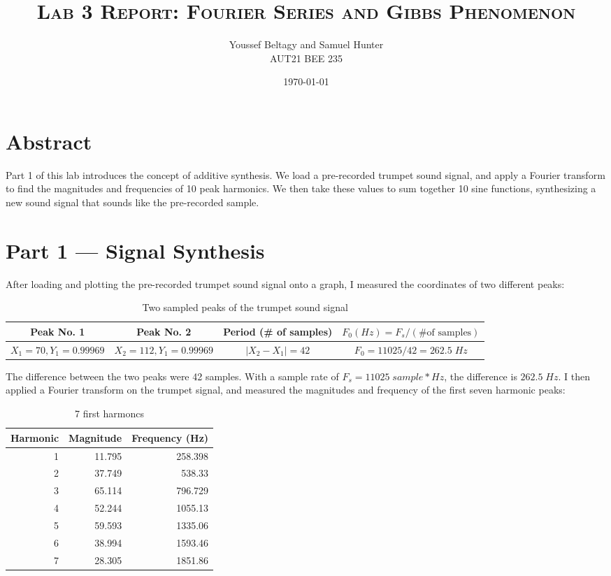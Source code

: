 \documentclass[11pt]{article}
\title{
    \textsc{Lab 3 Report: Fourier Series and Gibbs Phenomenon}
}
\author{
    \Large{Youssef Beltagy and Samuel Hunter} \\
    \large \textsc{AUT21 BEE 235}
}
\date{\today}
\begin{document}
\maketitle %
\pagebreak


\section{Abstract}

Part 1 of this lab introduces the concept of additive synthesis.
We load a pre-recorded trumpet sound signal, and apply a Fourier transform to find the magnitudes and frequencies of 10 peak harmonics.
We then take these values to sum together 10 sine functions, synthesizing a new sound signal that sounds like the pre-recorded sample.

\section{Part 1 --- Signal Synthesis}

After loading and plotting the pre-recorded trumpet sound signal onto a graph, I measured the coordinates of two different peaks:

\begin{table}[H]
	\centering
	\begin{tabular}{cccc}\toprule
		Peak No. 1 & Peak No. 2 & Period (\# of samples) & $F_0 (Hz) = F_s / (\textrm{\# of samples})$ \\\midrule

		$X_1 = 70, Y_1 = 0.99969$ &
		$X_2 = 112, Y_1 = 0.99969$ &
		$|X_2-X_1| = 42$ &
		$F_0 = 11025 / 42 = 262.5\;Hz$ \\\bottomrule
	\end{tabular}
	\caption{\label{tab:two-peaks}Two sampled peaks of the trumpet sound signal}
\end{table}

The difference between the two peaks were 42 samples.
With a sample rate of $F_s = 11025\;sample*Hz$, the difference is $262.5\;Hz$.
I then applied a Fourier transform on the trumpet signal, and measured the magnitudes and frequency of the first seven harmonic peaks:

\begin{table}[H]
	\centering
	\begin{tabular}{rrr}\toprule
		Harmonic & Magnitude & Frequency (Hz) \\\midrule

		1 & 11.795 & 258.398 \\
		2 & 37.749 & 538.33  \\
		3 & 65.114 & 796.729 \\
		4 & 52.244 & 1055.13 \\
		5 & 59.593 & 1335.06 \\
		6 & 38.994 & 1593.46 \\
		7 & 28.305 & 1851.86 \\\bottomrule
	\end{tabular}
	\caption{\label{tab:first-harmonics}7 first harmoncs}
\end{table}
\end{document}
